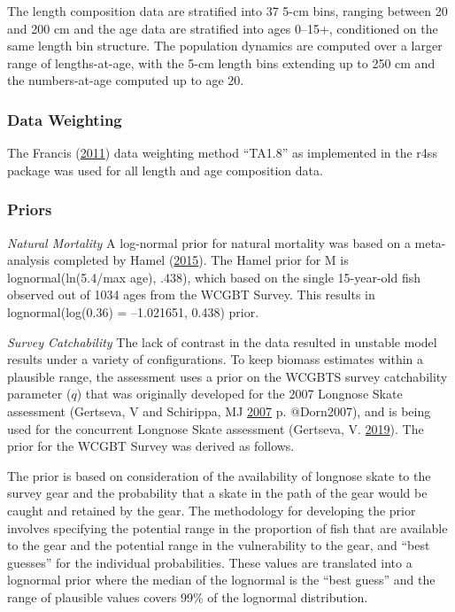 \documentclass[12pt,]{article}
\begin{document}
The length composition data are stratified into 37 5-cm bins, ranging
between 20 and 200 cm and the age data are stratified into ages 0--15+,
conditioned on the same length bin structure. The population dynamics
are computed over a larger range of lengths-at-age, with the 5-cm length
bins extending up to 250 cm and the numbers-at-age computed up to age
20.

\hypertarget{data-weighting}{%
\subsubsection{Data Weighting}\label{data-weighting}}

The Francis (\protect\hyperlink{ref-Francis2011}{2011}) data weighting
method ``TA1.8'' as implemented in the r4ss package was used for all
length and age composition data.

\hypertarget{priors}{%
\subsubsection{Priors}\label{priors}}

\emph{Natural Mortality} A log-normal prior for natural mortality was
based on a meta-analysis completed by Hamel
(\protect\hyperlink{ref-Hamel2015}{2015}). The Hamel prior for M is
lognormal(ln(5.4/max age), .438), which based on the single 15-year-old
fish observed out of 1034 ages from the WCGBT Survey. This results in
lognormal(log(0.36) = --1.021651, 0.438) prior.

\vspace{.5cm}

\emph{Survey Catchability} The lack of contrast in the data resulted in
unstable model results under a variety of configurations. To keep
biomass estimates within a plausible range, the assessment uses a prior
on the WCGBTS survey catchability parameter (\(q\)) that was originally
developed for the 2007 Longnose Skate assessment (Gertseva, V and
Schirippa, MJ \protect\hyperlink{ref-Gertseva2007}{2007} p. @Dorn2007),
and is being used for the concurrent Longnose Skate assessment
(Gertseva, V. \protect\hyperlink{ref-Gertseva2019}{2019}). The prior for
the WCGBT Survey was derived as follows.

The prior is based on consideration of the availability of longnose
skate to the survey gear and the probability that a skate in the path of
the gear would be caught and retained by the gear. The methodology for
developing the prior involves specifying the potential range in the
proportion of fish that are available to the gear and the potential
range in the vulnerability to the gear, and ``best guesses'' for the
individual probabilities. These values are translated into a lognormal
prior where the median of the lognormal is the ``best guess'' and the
range of plausible values covers 99\% of the lognormal distribution.
\end{document}
